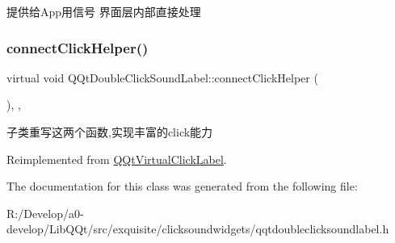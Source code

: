 提供给\+App用信号 界面层内部直接处理 \mbox{\label{class_q_qt_double_click_sound_label_ad87858f08468acc0bac61228d6f3290c}} 
\subsubsection{\texorpdfstring{connect\+Click\+Helper()}{connectClickHelper()}}
{\footnotesize\ttfamily virtual void Q\+Qt\+Double\+Click\+Sound\+Label\+::connect\+Click\+Helper (\begin{DoxyParamCaption}{ }\end{DoxyParamCaption})\hspace{0.3cm}{\ttfamily [inline]}, {\ttfamily [protected]}, {\ttfamily [virtual]}}

子类重写这两个函数,实现丰富的click能力 

Reimplemented from \mbox{\hyperlink{class_q_qt_virtual_click_label_a6e008887a4f2d5287e329a53caf8222c}{Q\+Qt\+Virtual\+Click\+Label}}.



The documentation for this class was generated from the following file\+:\begin{DoxyCompactItemize}
\item 
R\+:/\+Develop/a0-\/develop/\+Lib\+Q\+Qt/src/exquisite/clicksoundwidgets/qqtdoubleclicksoundlabel.\+h\end{DoxyCompactItemize}
